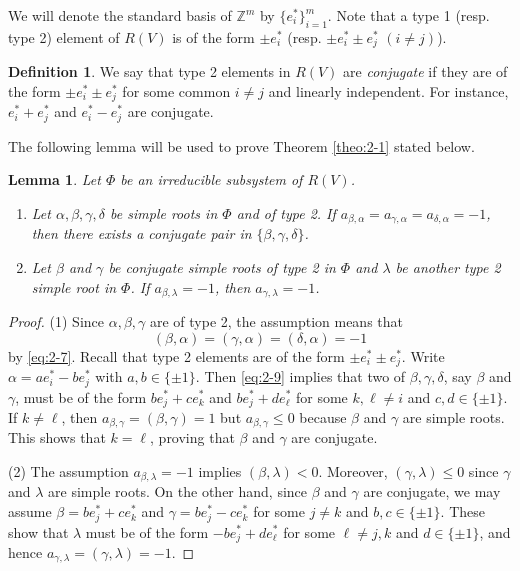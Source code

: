 \documentclass[12pt]{amsart}
\theoremstyle{plain} \numberwithin{equation}{section}
\newtheorem{lemm}[theo]{Lemma}
\theoremstyle{definition}
\newtheorem{defi}[theo]{Definition}
\def\Z{\mathbb Z}
\def\MV{V}
\begin{document}
We will denote the standard basis of $\Z^m$ by $\{e_i^*\}_{i=1}^m$.  Note that a type 1 (resp. type 2) element of $R(\MV)$ is of the form $\pm e_i^*$ (resp. $\pm e_i^*\pm e_j^*$ $(i\not=j)$).      

\begin{defi} \label{defi:2-2}
We say that type 2 elements in $R(\MV)$ are \emph{conjugate} if they are of the form $\pm e_i^*\pm e_j^*$ for some common $i\not=j$ and linearly independent.  For instance, $e_i^*+e_j^*$ and $e_i^*-e_j^*$ are conjugate.
\end{defi}

The following lemma will be used to prove Theorem \ref{theo:2-1} stated below.  

\begin{lemm} \label{lemm:2-2}
Let $\Phi$ be an irreducible subsystem of $R(\MV)$.
\begin{enumerate}
\item Let $\alpha, \beta,\gamma,\delta$ be simple roots in $\Phi$ and of type 2.  If $a_{\beta,\alpha}=a_{\gamma,\alpha}=a_{\delta,\alpha}=-1$, then there exists a conjugate pair in $\{\beta,\gamma,\delta\}$.
\item Let $\beta$ and $\gamma$ be conjugate simple roots of type 2 in $\Phi$ and $\lambda$ be another type 2 simple root in $\Phi$.  If $a_{\beta,\lambda}=-1$, then $a_{\gamma,\lambda}=-1$.  
\end{enumerate}
\end{lemm}

\begin{proof}
(1) Since $\alpha,\beta,\gamma$ are of type 2,  the assumption means that 
\begin{equation} \label{eq:2-9}
(\beta,\alpha)=(\gamma,\alpha)=(\delta,\alpha)=-1
\end{equation} 
by \eqref{eq:2-7}.  Recall that type 2 elements are of the form $\pm e_i^*\pm e_j^*$.  Write $\alpha=ae_i^*-b e_j^*$ with $a,b\in\{\pm 1\}$.  Then \eqref{eq:2-9} implies that two of $\beta, \gamma, \delta$, say $\beta$ and $\gamma$, must be of the form $b e_j^*+c e_k^*$ and $b e_j^*+d e_\ell^*$ for some $k, \ell\not=i$ and $c,d \in\{\pm 1\}$.  If $k\not=\ell$, then $a_{\beta,\gamma}=(\beta,\gamma)=1$ but $a_{\beta,\gamma}\le 0$ because $\beta$ and $\gamma$ are simple roots.  This shows that $k=\ell$, proving that $\beta$ and $\gamma$ are conjugate. 

(2) The assumption $a_{\beta,\lambda}=-1$ implies $(\beta,\lambda)<0$.  Moreover, $(\gamma,\lambda)\le 0$ since $\gamma$ and $\lambda$ are simple roots.  On the other hand, since $\beta$ and $\gamma$ are conjugate, we may assume $\beta=b e_j^*+c e_k^*$ and $\gamma=b e_j^*-c e_k^*$ for some $j\not=k$ and $b,c\in\{\pm 1\}$.  These show that $\lambda$ must be of the form $-b e_j^*+d e_\ell^*$ for some $\ell\not=j, k$ and $d\in \{\pm 1\}$, and hence $a_{\gamma,\lambda}=(\gamma,\lambda)=-1$.  
\end{proof}
\end{document}
